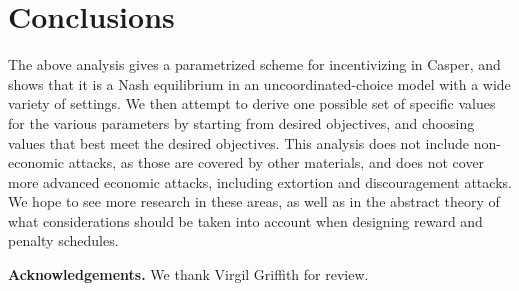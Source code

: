 \documentclass[12pt, final]{article}
\begin{document}
\section{Conclusions}

The above analysis gives a parametrized scheme for incentivizing in Casper, and shows that it is a Nash equilibrium in an uncoordinated-choice model with a wide variety of settings. We then attempt to derive one possible set of specific values for the various parameters by starting from desired objectives, and choosing values that best meet the desired objectives. This analysis does not include non-economic attacks, as those are covered by other materials, and does not cover more advanced economic attacks, including extortion and discouragement attacks. We hope to see more research in these areas, as well as in the abstract theory of what considerations should be taken into account when designing reward and penalty schedules.

\textbf{Acknowledgements.}  We thank Virgil Griffith for review.







\end{document}
